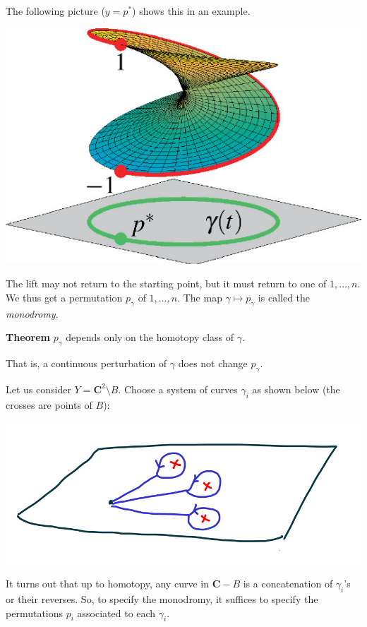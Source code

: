 \documentclass[11pt]{article}
\begin{document}
The following picture (\(y = p^{*}\)) shows this in an example.
\begin{center}
\includegraphics[width=.9\linewidth]{assets/Course_notes/2023-03-24_14-26-49_491839_1_En_4_Fig2_HTML.png}
\end{center}

The lift may not return to the starting point, but it must return to one of \(1, \dots, n\).
We thus get a permutation \(p_{\gamma}\) of \(1,\dots, n\).
The map \(\gamma \mapsto p_{\gamma}\) is called the \emph{monodromy}.

\textbf{\textbf{Theorem}} \(p_{\gamma}\) depends only on the homotopy class of \(\gamma\).

That is, a continuous perturbation of \(\gamma\) does not change \(p_{\gamma}\).

Let us consider \(Y = \mathbf{C}^2 \setminus B\).
Choose a system of curves \(\gamma_{i}\) as shown below (the crosses are points of \(B\)):
\begin{center}
\includegraphics[width=.9\linewidth]{assets/Course_notes/2023-03-24_14-58-52_screenshot.png}
\end{center}
It turns out that up to homotopy, any curve in \(\mathbf{C}-B\) is a concatenation of \(\gamma_i\)'s or their reverses.
So, to specify the monodromy, it suffices to specify the permutations \(p_i\) associated to each \(\gamma_{i}\).
\end{document}
